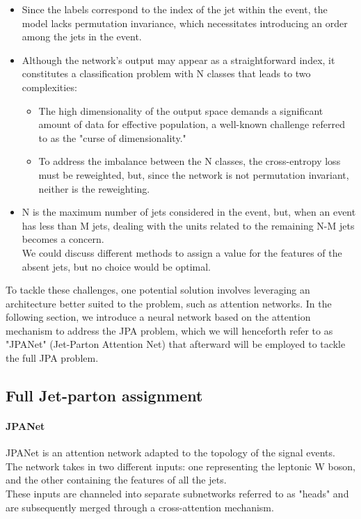 \begin{itemize}
    \item Since the labels correspond to the index of the jet within the event, the model lacks permutation invariance, which necessitates introducing an order among the jets in the event.
    \item Although the network's output may appear as a straightforward index,  it constitutes a classification problem with N classes that leads to two complexities:
    \begin{itemize}
        \item[\ding{111}] The high dimensionality of the output space demands a significant amount of data for effective population, a well-known challenge referred to as the "curse of dimensionality."
        \item[\ding{111}] To address the imbalance between the N classes, the cross-entropy loss must be reweighted, but, since the network is not permutation invariant, neither is the reweighting.
    \end{itemize}
    \item N is the maximum number of jets considered in the event, but, when an event has less than M jets, dealing with the units related to the remaining N-M jets becomes a concern.\\
    We could discuss different methods to assign a value for the features of the absent jets, but no choice would be optimal.
\end{itemize}
To tackle these challenges, one potential solution involves leveraging an architecture better suited to the problem, such as attention networks. In the following section, we introduce a neural network based on the attention mechanism to address the JPA problem, which we will henceforth refer to as "JPANet" (Jet-Parton Attention Net) that afterward will be employed to tackle the full JPA problem.

\subsection{Full Jet-parton assignment}
\paragraph*{JPANet}
JPANet is an attention network adapted to the topology of the signal events.\\
The network takes in two different inputs: one representing the leptonic W boson, and the other containing the features of all the jets.\\
These inputs are channeled into separate subnetworks referred to as "heads" and are subsequently merged through a cross-attention mechanism.\\



